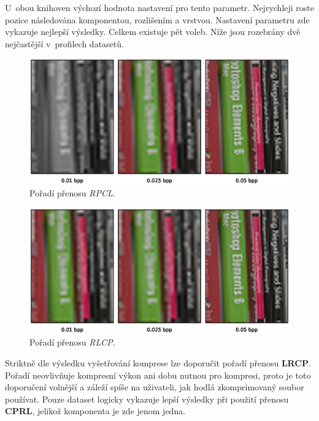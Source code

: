 \noindent U~obou knihoven výchozí hodnota nastavení pro tento parametr. Nejrychleji roste pozice následována komponentou, rozlišením a vrstvou. Nastavení parametru zde vykazuje nejlepší výsledky. Celkem existuje pět voleb. Níže jsou rozebrány dvě nejčastější v~profilech datasetů.
\clearpage
\begin{figure}[hbt!]
  \centering
  \hspace*{-0.75cm}
  \includegraphics[width=16cm]{obrazky-figures/order/rpcl.eps}
  \caption{Pořadí přenosu \textit{RPCL}.}
\end{figure}

\begin{figure}[hbt!]
  \centering
  \hspace*{-0.75cm}
  \includegraphics[width=16cm]{obrazky-figures/order/rlcp.eps}
  \caption{Pořadí přenosu \textit{RLCP}.}
\end{figure}

\noindent Striktně dle výsledku vyšetřování komprese lze doporučit pořadí přenosu \textbf{LRCP}. Pořadí neovlivňuje kompresní výkon ani dobu nutnou pro kompresi, proto je toto doporučení volnější a záleží spíše na uživateli, jak hodlá zkomprimovaný soubor používat.  Pouze dataset  logicky vykazuje lepší výsledky při použití přenosu \textbf{CPRL}, jelikož komponenta je zde jenom jedna.

